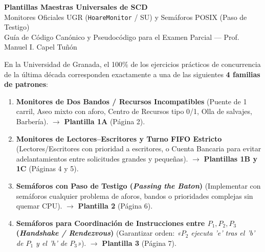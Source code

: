 \documentclass[11pt,a4paper]{article}
\begin{document}
\begin{tcolorbox}[
    colback=scdDarkBlue,
    colframe=scdDarkBlue,
    arc=4pt,
    left=8pt, right=8pt, top=6pt, bottom=6pt
]
    \centering
    {\LARGE\bfseries\color{white} Plantillas Maestras Universales de SCD}\\[2pt]
    {\normalsize\color{scdLightAccent} Monitores Oficiales UGR (\texttt{HoareMonitor} / SU) y Semáforos POSIX (Paso de Testigo)}\\[2pt]
    {\footnotesize\color{gray!30} Guía de Código Canónico y Pseudocódigo para el Examen Parcial --- Prof. Manuel I. Capel Tuñón}
\end{tcolorbox}

\vspace{0.1cm}

\begin{tcolorbox}[colback=scdLightGreen,colframe=scdGreen,title=\textbf{¿Por qué estas plantillas cubren el 100\% de los problemas de examen?},arc=3pt]
\small
En la Universidad de Granada, el 100\% de los ejercicios prácticos de concurrencia de la última década corresponden exactamente a una de las siguientes \textbf{4 familias de patrones}:
\begin{enumerate}[leftmargin=*,itemsep=1pt]
    \item \textbf{Monitores de Dos Bandos / Recursos Incompatibles} (Puente de 1 carril, Aseo mixto con aforo, Centro de Recursos tipo 0/1, Olla de salvajes, Barbería). $\to$ \textbf{Plantilla 1A} (Página 2).
    \item \textbf{Monitores de Lectores--Escritores y Turno FIFO Estricto} (Lectores/Escritores con prioridad a escritores, o Cuenta Bancaria para evitar adelantamientos entre solicitudes grandes y pequeñas). $\to$ \textbf{Plantillas 1B y 1C} (Páginas 4 y 5).
    \item \textbf{Semáforos con Paso de Testigo (\textit{Passing the Baton})} (Implementar con semáforos cualquier problema de aforos, bandos o prioridades complejas sin quemar CPU). $\to$ \textbf{Plantilla 2} (Página 6).
    \item \textbf{Semáforos para Coordinación de Instrucciones entre $P_1, P_2, P_3$ (\textit{Handshake / Rendezvous})} (Garantizar orden: \textit{«$P_2$ ejecuta 'e' tras el 'b' de $P_1$ y el 'h' de $P_3$»}). $\to$ \textbf{Plantilla 3} (Página 7).
\end{enumerate}
\end{tcolorbox}
\end{document}
